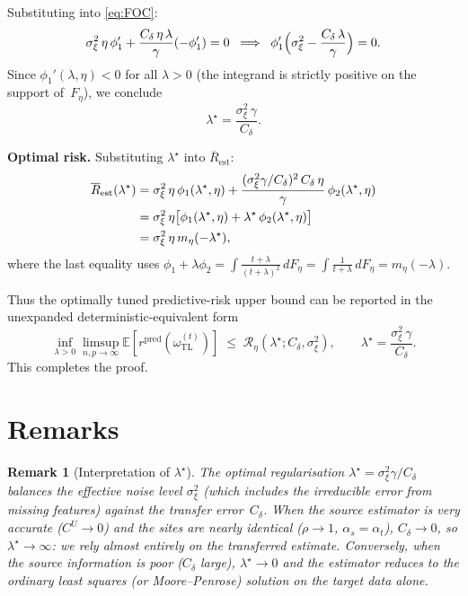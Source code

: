 \documentclass[11pt,a4paper]{article}
\newtheorem{remark}[theorem]{Remark}
\theoremstyle{definition}
\newcommand{\E}{\mathbb{E}}
\newcommand{\ohat}{\hat{\omega}_{\mathrm{TL}}^{(t)}}
\begin{document}
Substituting into \eqref{eq:FOC}:
\[
  \sigma_\xi^{2}\,\eta\,\phi_1'
  +\frac{C_\delta\,\eta\,\lambda}{\gamma}(-\phi_1')=0
  \;\implies\;
  \phi_1'\Bigl(\sigma_\xi^{2}-\frac{C_\delta\,\lambda}{\gamma}\Bigr)=0.
\]
Since $\phi_1'(\lambda,\eta)<0$ for all $\lambda>0$ (the integrand is
strictly positive on the support of~$F_\eta$), we conclude
\begin{equation}\label{eq:lambdastar_simple}
  \boxed{\lambda^{\star}=\frac{\sigma_\xi^{2}\,\gamma}{C_\delta}.}
\end{equation}

\medskip
\noindent\textbf{Optimal risk.}\quad
Substituting $\lambda^{\star}$ into
$\overline{R}_{\mathrm{est}}$:
\begin{align}
  \overline{R}_{\mathrm{est}}(\lambda^{\star})
  &=\sigma_\xi^{2}\,\eta\,\phi_1(\lambda^{\star},\eta)
  +\frac{(\sigma_\xi^{2}\gamma/C_\delta)^{2}\,C_\delta\,\eta}
  {\gamma}\,\phi_2(\lambda^{\star},\eta)
  \notag\\
  &=\sigma_\xi^{2}\,\eta\bigl[
  \phi_1(\lambda^{\star},\eta)
  +\lambda^{\star}\,\phi_2(\lambda^{\star},\eta)\bigr]
  \notag\\
  &=\sigma_\xi^{2}\,\eta\,m_\eta(-\lambda^{\star}),
  \label{eq:optRest}
\end{align}
where the last equality uses
$\phi_1+\lambda\phi_2=\int\frac{t+\lambda}{(t+\lambda)^{2}}\,dF_\eta
=\int\frac{1}{t+\lambda}\,dF_\eta=m_\eta(-\lambda)$.

Thus the optimally tuned predictive-risk upper bound can be reported in
the unexpanded deterministic-equivalent form
\begin{equation}\label{eq:optbound}
  \boxed{
  \inf_{\lambda>0}\limsup_{n,p\to\infty}
  \E\!\left[r^{\mathrm{pred}}(\ohat)\right]
  \;\le\;
  \mathcal R_{\eta}\!\left(\lambda^\star;C_\delta,\sigma_\xi^2\right),
  \qquad
  \lambda^{\star}=\frac{\sigma_\xi^{2}\,\gamma}{C_\delta}.
  }
\end{equation}
This completes the proof.

\section{Remarks}\label{sec:remarks}

\begin{remark}[Interpretation of $\lambda^{\star}$]\label{rem:lambda}
The optimal regularisation
$\lambda^{\star}=\sigma_\xi^{2}\gamma/C_\delta$ balances the
effective noise level $\sigma_\xi^{2}$ (which includes
the irreducible error from missing features) against the transfer
error~$C_\delta$.  When the source estimator is very
accurate ($C^{U}\to 0$) and the sites are nearly identical
($\rho\to 1$, $\alpha_s=\alpha_t$), $C_\delta\to 0$, so
$\lambda^{\star}\to\infty$: we rely almost entirely on the
transferred estimate.  Conversely, when the source information is
poor ($C_\delta$ large), $\lambda^{\star}\to 0$ and the estimator
reduces to the ordinary least squares (or Moore--Penrose) solution
on the target data alone.
\end{remark}
\end{document}
